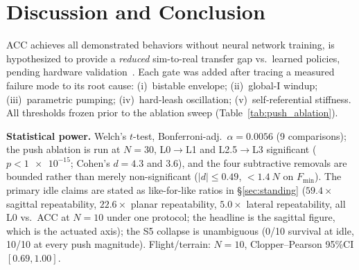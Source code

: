 \documentclass[conference]{IEEEtran}
\begin{document}
\section{Discussion and Conclusion}
\label{sec:discussion}

ACC achieves all demonstrated behaviors without neural network training, is hypothesized to provide a \emph{reduced} sim-to-real transfer gap vs.\ learned policies, pending hardware validation~\cite{grimminger2020torque}.
Each gate was added after tracing a measured failure mode to its root cause: (i)~bistable envelope; (ii)~global-I windup; (iii)~parametric pumping; (iv)~hard-leash oscillation; (v)~self-referential stiffness. All thresholds frozen prior to the ablation sweep (Table~\ref{tab:push_ablation}).

\textbf{Statistical power.}
Welch's $t$-test, Bonferroni-adj.\ $\alpha{=}0.0056$ (9 comparisons); the push ablation is run at $N{=}30$, L0$\rightarrow$L1 and L2.5$\rightarrow$L3 significant ($p{<}\num{1e-15}$; Cohen's $d{=}4.3$ and $3.6$), and the four subtractive removals are bounded rather than merely non-significant ($|d|{\le}0.49$, ${<}\SI{1.4}{N}$ on $F_{\min}$). The primary idle claims are stated as like-for-like ratios in \S\ref{sec:standing} ($59.4{\times}$ sagittal repeatability, $22.6{\times}$ planar repeatability, $5.0{\times}$ lateral repeatability, all L0 vs.\ ACC at $N{=}10$ under one protocol; the headline is the sagittal figure, which is the actuated axis); the S5 collapse is unambiguous (\num{0}/\num{10} survival at idle, \num{10}/\num{10} at every push magnitude). Flight/terrain: $N{=}10$, Clopper--Pearson 95\%CI $[0.69,1.00]$.
\end{document}
